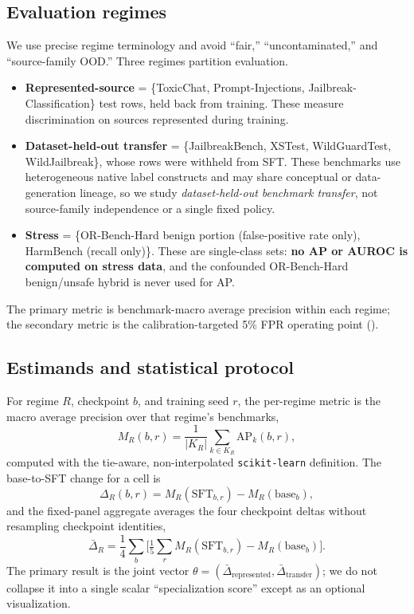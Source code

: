 \documentclass[sigconf,nonacm]{acmart}
\begin{document}
\subsection{Evaluation regimes}
\label{subsec:regimes}

We use precise regime terminology and avoid ``fair,'' ``uncontaminated,'' and ``source-family OOD.'' Three regimes partition evaluation.

\begin{itemize}
  \item \textbf{Represented-source} = \{ToxicChat, Prompt-Injections, Jailbreak-Classification\} test rows, held back from training. These measure discrimination on sources represented during training.
  \item \textbf{Dataset-held-out transfer} = \{JailbreakBench, XSTest, WildGuardTest, WildJailbreak\}, whose rows were withheld from SFT. These benchmarks use heterogeneous native label constructs and may share conceptual or data-generation lineage, so we study \emph{dataset-held-out benchmark transfer}, not source-family independence or a single fixed policy.
  \item \textbf{Stress} = \{OR-Bench-Hard benign portion (false-positive rate only), HarmBench (recall only)\}. These are single-class sets: \textbf{no AP or AUROC is computed on stress data}, and the confounded OR-Bench-Hard benign/unsafe hybrid is never used for AP.
\end{itemize}

The primary metric is benchmark-macro average precision within each regime; the secondary metric is the calibration-targeted 5\% FPR operating point ().

\subsection{Estimands and statistical protocol}
\label{subsec:estimands}

For regime $R$, checkpoint $b$, and training seed $r$, the per-regime metric is the macro average precision over that regime's benchmarks,
\begin{equation}
\label{eq:regime-metric}
M_R(b,r) = \frac{1}{|K_R|}\sum_{k\in K_R} \mathrm{AP}_k(b,r),
\end{equation}
computed with the tie-aware, non-interpolated \texttt{scikit-learn} definition. The base-to-SFT change for a cell is
\begin{equation}
\label{eq:delta}
\Delta_R(b,r) = M_R(\mathrm{SFT}_{b,r}) - M_R(\mathrm{base}_b),
\end{equation}
and the fixed-panel aggregate averages the four checkpoint deltas without resampling checkpoint identities,
\begin{equation}
\label{eq:agg}
\bar\Delta_R = \frac{1}{4}\sum_b\Big[\tfrac{1}{5}\textstyle\sum_r M_R(\mathrm{SFT}_{b,r}) - M_R(\mathrm{base}_b)\Big].
\end{equation}
The primary result is the joint vector $\theta = (\bar\Delta_{\text{represented}}, \bar\Delta_{\text{transfer}})$; we do not collapse it into a single scalar ``specialization score'' except as an optional visualization.
\end{document}
